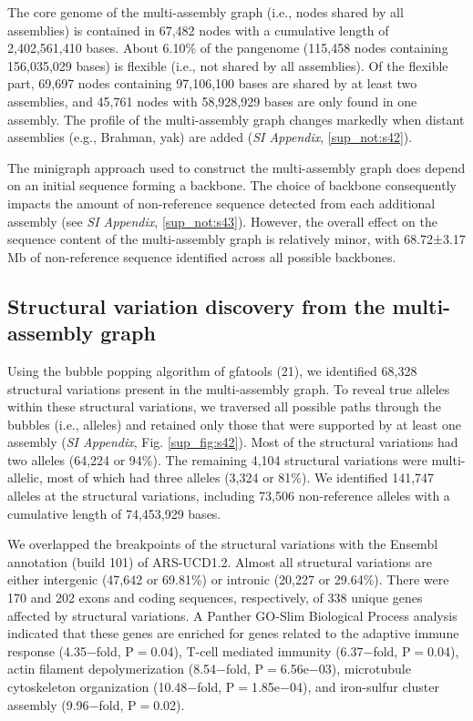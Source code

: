 \documentclass[../main.tex]{subfiles}
\begin{document}
The core genome of the multi-assembly graph (i.e., nodes shared by all assemblies) is contained in 67,482 nodes with a cumulative length of 2,402,561,410 bases. About 6.10\% of the pangenome (115,458 nodes containing 156,035,029 bases) is flexible (i.e., not shared by all assemblies). Of the flexible part, 69,697 nodes containing 97,106,100 bases are shared by at least two assemblies, and 45,761 nodes with 58,928,929 bases are only found in one assembly. The profile of the multi-assembly graph changes markedly when distant assemblies (e.g., Brahman, yak) are added (\emph{SI Appendix}, \ref{sup_not:s42}).

The minigraph approach used to construct the multi-assembly graph does depend on an initial sequence forming a backbone. The choice of backbone consequently impacts the amount of non-reference sequence detected from each additional assembly (see \emph{SI Appendix}, \ref{sup_not:s43}). However, the overall effect on the sequence content of the multi-assembly graph is relatively minor, with 68.72±3.17 Mb of non-reference sequence identified across all possible backbones.

\subsection*{Structural variation discovery from the multi-assembly graph}

Using the bubble popping algorithm of gfatools (21), we identified 68,328 structural variations present in the multi-assembly graph. To reveal true alleles within these structural variations, we traversed all possible paths through the bubbles (i.e., alleles) and retained only those that were supported by at least one assembly (\emph{SI Appendix}, Fig. \ref{sup_fig:s42}). Most of the structural variations had two alleles (64,224 or 94\%). The remaining 4,104 structural variations were multi-allelic, most of which had three alleles (3,324 or 81\%). We identified 141,747 alleles at the structural variations, including 73,506 non-reference alleles with a cumulative length of 74,453,929 bases.  

We overlapped the breakpoints of the structural variations with the Ensembl annotation (build 101) of ARS-UCD1.2. Almost all structural variations are either intergenic (47,642 or 69.81\%) or intronic (20,227 or 29.64\%). There were 170 and 202 exons and coding sequences, respectively, of 338 unique genes affected by structural variations. A Panther GO-Slim Biological Process \citep{mi2019panther} analysis indicated that these genes are enriched for genes related to the adaptive immune response (4.35$-$fold, P$=$0.04), T-cell mediated immunity (6.37$-$fold, P$=$0.04), actin filament depolymerization (8.54$-$fold, P$=$6.56e$-$03), microtubule cytoskeleton organization (10.48$-$fold, P$=$1.85e$-$04), and iron-sulfur cluster assembly (9.96$-$fold, P$=$0.02). 
\end{document}
